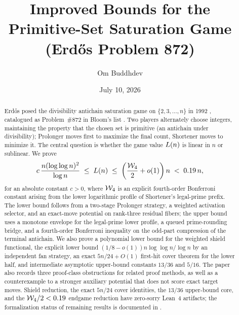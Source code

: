 \documentclass[11pt]{amsart}
\title[Bounds for the Primitive-Set Saturation Game]{Improved Bounds for the Primitive-Set Saturation Game (Erd\H{o}s Problem 872)}
\author{Om Buddhdev}
\date{July 10, 2026}
\begin{document}
\begin{abstract}
Erd\H{o}s posed the divisibility antichain saturation game on
$\{2,3,\ldots,n\}$ in 1992 \cite{Er92c}, catalogued as Problem~\#872 in
Bloom's list \cite{Bloom872}.  Two players alternately choose integers,
maintaining the property that the chosen set is primitive (an antichain
under divisibility); Prolonger moves first to maximize the final count,
Shortener moves to minimize it.  The central question is whether the game
value $L(n)$ is linear in $n$ or sublinear.  We prove
\[
  c\,\frac{n(\log\log n)^2}{\log n}
  \;\le\;
  L(n)
  \;\le\;
  \left(\frac{\mathcal{W}_4}{2}+o(1)\right)n
  \;<\;0.19\,n,
\]
for an absolute constant $c>0$, where $\mathcal{W}_4$ is an explicit fourth-order
Bonferroni constant arising from the lower logarithmic profile of Shortener's
legal-prime prefix.  The lower bound follows from a two-stage Prolonger
strategy, a weighted activation selector, and an exact-move potential on
rank-three residual fibers; the upper bound uses a monotone envelope for the
legal-prime lower profile, a queued prime-rounding bridge, and a fourth-order
Bonferroni inequality on the odd-part compression of the terminal antichain.
We also prove a polynomial lower bound for the weighted shield functional,
the explicit lower bound
$(1/8-o(1))n\log\log n/\log n$ by an independent fan strategy,
an exact $5n/24+O(1)$ first-hit cover theorem for the lower half, and
intermediate asymptotic upper-bound constants $13/36$ and $5/16$.
The paper also records three proof-class obstructions for related proof
methods, as well as a counterexample to a stronger auxiliary potential that
does not score exact target moves.  Shield reduction, the exact
$5n/24$ cover identities, the $13/36$ upper-bound core, and the
$\mathcal{W}_4/2<0.19$ endgame reduction have zero-sorry Lean~4 artifacts; the
formalization status of remaining results is documented in
.
\end{abstract}

\maketitle











\appendix



\end{document}
